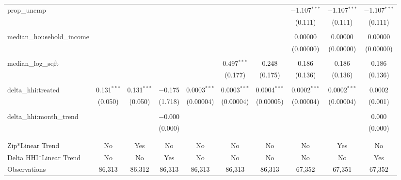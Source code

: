 \begin{table}[H]
{\begin{tabular}{@{\extracolsep{5pt}}lccccccccc}
  prop\_unemp &  &  &  &  &  &  & $-$1.107$^{***}$ & $-$1.107$^{***}$ & $-$1.107$^{***}$ \\  

   &  &  &  &  &  &  & (0.111) & (0.111) & (0.111) \\  

   & & & & & & & & & \\  

  median\_household\_income &  &  &  &  &  &  & 0.00000 & 0.00000 & 0.00000 \\  

   &  &  &  &  &  &  & (0.00000) & (0.00000) & (0.00000) \\  

   & & & & & & & & & \\  

  median\_log\_sqft &  &  &  &  & 0.497$^{***}$ & 0.248 & 0.186 & 0.186 & 0.186 \\  

   &  &  &  &  & (0.177) & (0.175) & (0.136) & (0.136) & (0.136) \\  

   & & & & & & & & & \\  

  delta\_hhi:treated & 0.131$^{***}$ & 0.131$^{***}$ & $-$0.175 & 0.0003$^{***}$ & 0.0003$^{***}$ & 0.0004$^{***}$ & 0.0002$^{***}$ & 0.0002$^{***}$ & 0.0002 \\  

   & (0.050) & (0.050) & (1.718) & (0.00004) & (0.00004) & (0.00005) & (0.00004) & (0.00004) & (0.001) \\  

   & & & & & & & & & \\  

  delta\_hhi:month\_trend &  &  & $-$0.000 &  &  &  &  &  & 0.000 \\  

   &  &  & (0.000) &  &  &  &  &  & (0.000) \\  

   & & & & & & & & & \\  

 \hline \\[-1.8ex]  

 Zip*Linear Trend & No & Yes & No & No & No & No & No & Yes & No \\  

 Delta HHI*Linear Trend & No & No & Yes & No & No & No & No & No & Yes \\  

 Observations & 86,313 & 86,312 & 86,313 & 86,313 & 86,313 & 86,313 & 67,352 & 67,351 & 67,352 \\  


\end{tabular}}
\end{table}
